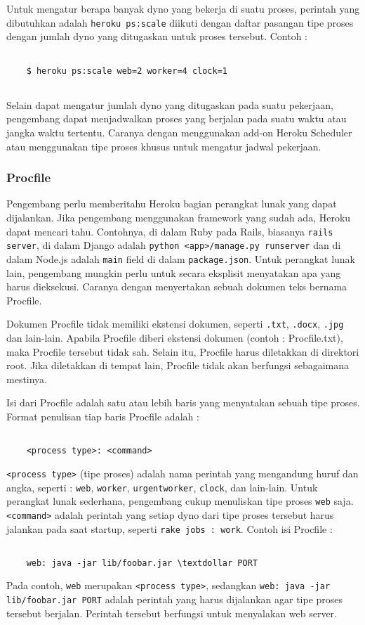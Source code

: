 Untuk mengatur berapa banyak dyno yang bekerja di suatu proses, perintah yang dibutuhkan adalah \texttt{heroku ps:scale} diikuti dengan daftar pasangan tipe proses dengan jumlah dyno yang ditugaskan untuk proses tersebut. Contoh :
\begin{lstlisting}

	$ heroku ps:scale web=2 worker=4 clock=1
	
\end{lstlisting}

Selain dapat mengatur jumlah dyno yang ditugaskan pada suatu pekerjaan, pengembang dapat menjadwalkan proses yang berjalan pada suatu waktu atau jangka waktu tertentu. Caranya dengan menggunakan add-on Heroku Scheduler atau menggunakan tipe proses khusus untuk mengatur jadwal pekerjaan.

\subsubsection{Procfile}
Pengembang perlu memberitahu Heroku bagian perangkat lunak yang dapat dijalankan. Jika pengembang menggunakan framework yang sudah ada, Heroku dapat mencari tahu. Contohnya, di dalam Ruby pada Rails, biasanya \texttt{rails server}, di dalam Django adalah \texttt{python <app>/manage.py runserver} dan di dalam Node.js adalah \texttt{main} field di dalam \texttt{package.json}. Untuk perangkat lunak lain, pengembang mungkin perlu untuk secara eksplisit menyatakan apa yang harus dieksekusi. Caranya dengan menyertakan sebuah dokumen teks bernama Procfile. 

Dokumen Procfile tidak memiliki ekstensi dokumen, seperti \texttt{.txt}, \texttt{.docx}, \texttt{.jpg} dan lain-lain. Apabila Procfile diberi ekstensi dokumen (contoh : Procfile.txt), maka Procfile tersebut tidak sah. Selain itu, Procfile harus diletakkan di direktori root. Jika diletakkan di tempat lain, Procfile tidak akan berfungsi sebagaimana mestinya.

Isi dari Procfile adalah satu atau lebih baris yang menyatakan sebuah tipe proses. Format penulisan tiap baris Procfile adalah : 
\begin{lstlisting}

	<process type>: <command>

\end{lstlisting}
\texttt{<process type>} (tipe proses) adalah nama perintah yang mengandung huruf dan angka, seperti : \texttt{web}, \texttt{worker}, \texttt{urgentworker}, \texttt{clock}, dan lain-lain. Untuk perangkat lunak sederhana, pengembang cukup menuliskan tipe proses \texttt{web} saja. \texttt{<command>} adalah perintah yang setiap dyno dari tipe proses tersebut harus jalankan pada saat startup, seperti \texttt{rake jobs : work}. Contoh isi Procfile :
\begin{lstlisting}

	web: java -jar lib/foobar.jar \textdollar PORT

\end{lstlisting}
Pada contoh, \texttt{web} merupakan \texttt{<process type>}, sedangkan \texttt{web: java -jar lib/foobar.jar \textdollar PORT} adalah perintah yang harus dijalankan agar tipe proses tersebut berjalan. Perintah tersebut berfungsi untuk menyalakan web server.

